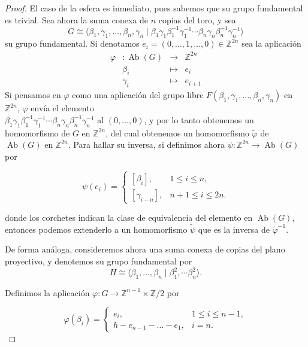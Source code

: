\documentclass[10pt]{report}
\newcommand{\Z}{\mathbb{Z}}
\DeclareMathOperator{\Ab}{Ab}
\theoremstyle{definition}
\begin{document}
\begin{proof}
El caso de la esfera es inmediato, pues sabemos que su grupo fundamental es trivial.
Sea ahora la suma conexa de $n$ copias del toro, y sea
\[ 
G\cong \langle \beta_1 , \gamma_1 , \dots , \beta_n, \gamma_n \mid \beta_1 \gamma_1 \beta_1^{-1} \gamma_1^{-1} \cdots \beta_n \gamma_n \beta_n^{-1} \gamma_n^{-1} \rangle
\]
su grupo fundamental. Si denotamos $e_i=(0,\dots ,1, \dots ,0) \in \mathbb{Z}^{2n}$ sea la aplicación
\[
\begin{array}{rccl}
\varphi &: \Ab{(G)} & \to & \mathbb{Z}^{2n}\\
& \beta_i & \mapsto & e_i \\
& \gamma_i & \mapsto & e_{i+1}
\end{array}
\]
Si pensamos en $\varphi$ como una aplicación del grupo libre $F(\beta_1 , \gamma_1 , \dots , \beta_n, \gamma_n )$ en $\mathbb{Z}^{2n}$, $\varphi$ envía el elemento\\ $\beta_1 \gamma_1 \beta_1^{-1} \gamma_1^{-1} \cdots \beta_n \gamma_n \beta_n^{-1} \gamma_n^{-1}$ al $(0,\dots ,0)$, y por lo tanto obtenemos un homomorfismo de $G$ en $\Z^{2n}$, del cual obtenemos un homomorfismo $\tilde{\varphi}$ de $\Ab{(G)}$ en $\mathbb{Z}^{2n}$. Para hallar su inversa, si definimos ahora  $\psi: \mathbb{Z}^{2n}\to \Ab{(G)}$ por

\[
\psi (e_i) = \left\{ 
\begin{array}{ll}
\left[ \beta_i \right] , & 1\leq i \leq n, \\
\left[ \gamma_{i-n} \right] , & n+1 \leq i \leq 2n.
\end{array} 
\right.
\]

donde los corchetes indican la clase de equivalencia del elemento en $\Ab{(G)}$, entonces podemos extenderlo a un homomorfismo $\tilde{\psi}$ que es la inversa de $\tilde{\varphi}^{-1}$.

De forma análoga, consideremos ahora una suma conexa de copias del plano proyectivo, y denotemos su grupo fundamental por
\[
H \cong \langle \beta_1 , \dots , \beta_n \mid \beta_1^2 , \cdots \beta_n^2 \rangle .
\]

Definimos la aplicación $\varphi : G \to \mathbb{Z}^{n-1} \times \mathbb{Z}/2$ por

\[
\varphi (\beta_i) = \left\{ 
\begin{array}{ll}
e_i , & 1\leq i \leq n-1, \\
h-e_{n-1} - \dots - e_1, & i=n. 
\end{array} 
\right.
\]


\end{proof}
\end{document}

